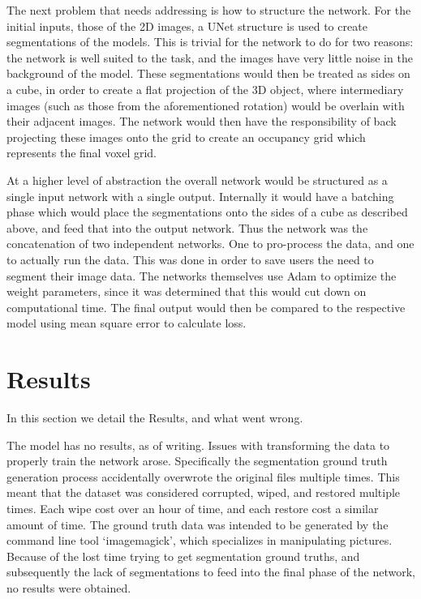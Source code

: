 \documentclass{article}
\begin{document}
The next problem that needs addressing is how to structure the network. 
For the initial inputs, those of the 2D images, a UNet structure is used to 
create segmentations of the models. 
This is trivial for the network to do for two reasons: the network is well suited
to the task, and the images have very little noise in the background of the model.
These segmentations would then be treated as sides on a cube, in order to create
a flat projection of the 3D object, where intermediary images (such as those from
the aforementioned rotation) would be overlain with their adjacent images. 
The network would then have the responsibility of back projecting these images
onto the grid to create an occupancy grid which represents the final voxel grid.

At a higher level of abstraction the overall network would be structured as a single
input network with a single output. 
Internally it would have a batching phase which would place the segmentations onto
the sides of a cube as described above, and feed that into the output network.
Thus the network was the concatenation of two independent networks. 
One to pro-process the data, and one to actually run the data. 
This was done in order to save users the need to segment their image data.
The networks themselves use Adam to optimize the weight parameters, since it was
determined that this would cut down on computational time.
The final output would then be compared to the respective model using mean square 
error to calculate loss.


\section{Results}

In this section we detail the Results, and what went wrong.

The model has no results, as of writing. 
Issues with transforming the data to properly train the network arose. 
Specifically the segmentation ground truth generation process accidentally 
overwrote the original files multiple times. 
This meant that the dataset was considered corrupted, wiped, and restored multiple
times. 
Each wipe cost over an hour of time, and each restore cost a similar amount of
time. 
The ground truth data was intended to be generated by the command line tool 
`imagemagick', which specializes in manipulating pictures. 
Because of the lost time trying to get segmentation ground truths, and subsequently
the lack of segmentations to feed into the final phase of the network, no results
were obtained. 


\nocite{*}

\end{document}

